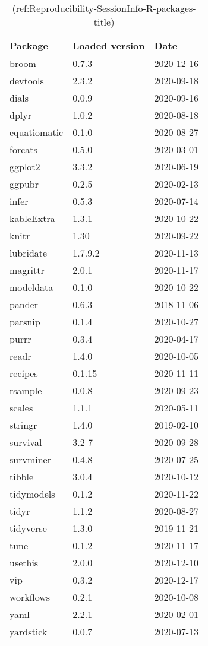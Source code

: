 \begin{table}

\caption[ ]{\label{tab:}(ref:Reproducibility-SessionInfo-R-packages-title)}
\centering
\begin{tabular}[t]{lll}
\toprule
Package & Loaded version & Date\\
\midrule
broom & 0.7.3 & 2020-12-16\\
devtools & 2.3.2 & 2020-09-18\\
dials & 0.0.9 & 2020-09-16\\
dplyr & 1.0.2 & 2020-08-18\\
equatiomatic & 0.1.0 & 2020-08-27\\
\addlinespace
forcats & 0.5.0 & 2020-03-01\\
ggplot2 & 3.3.2 & 2020-06-19\\
ggpubr & 0.2.5 & 2020-02-13\\
infer & 0.5.3 & 2020-07-14\\
kableExtra & 1.3.1 & 2020-10-22\\
\addlinespace
knitr & 1.30 & 2020-09-22\\
lubridate & 1.7.9.2 & 2020-11-13\\
magrittr & 2.0.1 & 2020-11-17\\
modeldata & 0.1.0 & 2020-10-22\\
pander & 0.6.3 & 2018-11-06\\
\addlinespace
parsnip & 0.1.4 & 2020-10-27\\
purrr & 0.3.4 & 2020-04-17\\
readr & 1.4.0 & 2020-10-05\\
recipes & 0.1.15 & 2020-11-11\\
rsample & 0.0.8 & 2020-09-23\\
\addlinespace
scales & 1.1.1 & 2020-05-11\\
stringr & 1.4.0 & 2019-02-10\\
survival & 3.2-7 & 2020-09-28\\
survminer & 0.4.8 & 2020-07-25\\
tibble & 3.0.4 & 2020-10-12\\
\addlinespace
tidymodels & 0.1.2 & 2020-11-22\\
tidyr & 1.1.2 & 2020-08-27\\
tidyverse & 1.3.0 & 2019-11-21\\
tune & 0.1.2 & 2020-11-17\\
usethis & 2.0.0 & 2020-12-10\\
\addlinespace
vip & 0.3.2 & 2020-12-17\\
workflows & 0.2.1 & 2020-10-08\\
yaml & 2.2.1 & 2020-02-01\\
yardstick & 0.0.7 & 2020-07-13\\
\bottomrule
\end{tabular}
\end{table}
